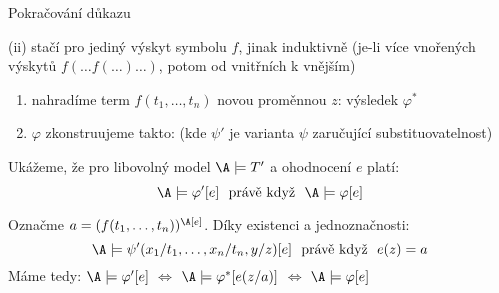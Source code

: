 \documentclass{beamer}
\begin{document}
\begin{frame}{Pokračování důkazu}

    \pause 
    \alert{(ii)} stačí pro jediný výskyt symbolu $f$, jinak induktivně (je-li více vnořených výskytů $f(\dots f(\dots)\dots)$, potom od vnitřních k vnějším)

    \pause 
    \begin{enumerate}
    \item  nahradíme term $f(t_1,\dots,t_n)$ \alert{novou} proměnnou $z$: \alert{výsledek $\varphi^*$} \pause 
    \item $\varphi$ zkonstruujeme takto: 
     (kde $\psi'$ je varianta $\psi$ zaručující substituovatelnost)
    \end{enumerate}\pause 

    Ukážeme, že pro libovolný model $\A\models T'$ a ohodnocení $e$ platí:
    $$
    \A\models\varphi'[e]\ \text{ právě když }\ \A\models\varphi[e]
    $$\pause 
      
    Označme \alert{$a=(f(t_1,\dots,t_n))^\A[e]$}. Díky existenci a jednoznačnosti:
    $$
    \A\models\psi'(x_1/t_1,\dots,x_n/t_n,y/z)[e]\ \text{ právě když }\ e(z)=a 
    $$\pause 
    Máme tedy: $\A\models\varphi'[e]$ $\Leftrightarrow$ $\A\models\varphi^*[e(z/a)]$ $\Leftrightarrow$ $\A\models\varphi[e]$ \hfill\qedsymbol    

\end{frame}
\end{document}

